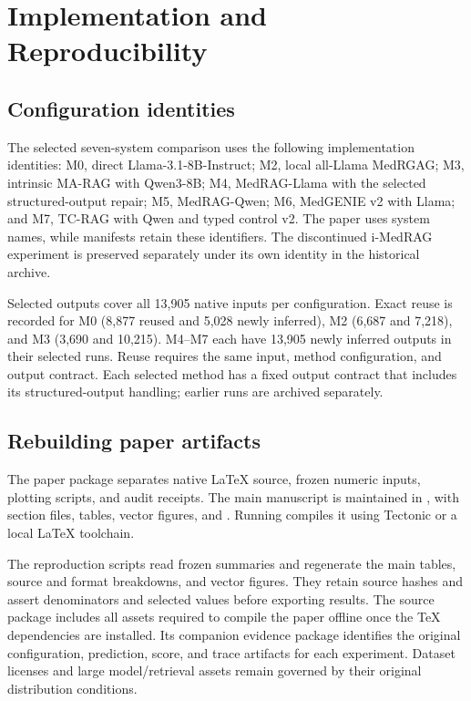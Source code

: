 \section{Implementation and Reproducibility}
\label{app:implementation}

\subsection{Configuration identities}
The selected seven-system comparison uses the following implementation identities: M0, direct Llama-3.1-8B-Instruct; M2, local all-Llama MedRGAG; M3, intrinsic MA-RAG with Qwen3-8B; M4, MedRAG-Llama with the selected structured-output repair; M5, MedRAG-Qwen; M6, MedGENIE v2 with Llama; and M7, TC-RAG with Qwen and typed control v2. The paper uses system names, while manifests retain these identifiers. The discontinued i-MedRAG experiment is preserved separately under its own identity in the historical archive.

Selected outputs cover all 13,905 native inputs per configuration. Exact reuse is recorded for M0 (8,877 reused and 5,028 newly inferred), M2 (6,687 and 7,218), and M3 (3,690 and 10,215). M4--M7 each have 13,905 newly inferred outputs in their selected runs. Reuse requires the same input, method configuration, and output contract. Each selected method has a fixed output contract that includes its structured-output handling; earlier runs are archived separately.

\subsection{Rebuilding paper artifacts}
The paper package separates native LaTeX source, frozen numeric inputs, plotting scripts, and audit receipts. The main manuscript is maintained in , with section files, tables, vector figures, and . Running  compiles it using Tectonic or a local \LaTeX{} toolchain.

The reproduction scripts read frozen summaries and regenerate the main tables, source and format breakdowns, and vector figures. They retain source hashes and assert denominators and selected values before exporting results. The source package includes all assets required to compile the paper offline once the TeX dependencies are installed. Its companion evidence package identifies the original configuration, prediction, score, and trace artifacts for each experiment. Dataset licenses and large model/retrieval assets remain governed by their original distribution conditions.


